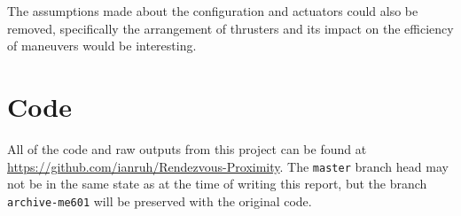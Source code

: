 \documentclass[conference]{IEEEtran}
\begin{document}
The assumptions made about the configuration and actuators could also be
removed, specifically the arrangement of thrusters and its impact on the
efficiency of maneuvers would be interesting.



\section*{Code}

All of the code and raw outputs from this project can be found at 
\url{https://github.com/ianruh/Rendezvous-Proximity}. The \texttt{master}
branch head may not be in the same state as at the time of writing this report,
but the branch \texttt{archive-me601} will be preserved with the original code.




\end{document}
